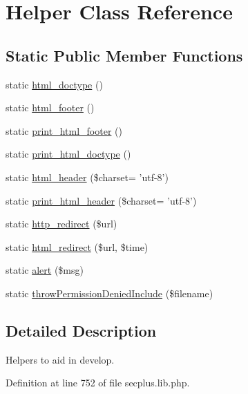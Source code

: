 \hypertarget{class_sec_plus_1_1_helper}{
\section{Helper Class Reference}
\label{class_sec_plus_1_1_helper}
}
\subsection*{Static Public Member Functions}
\begin{DoxyCompactItemize}
\item 
static \hyperlink{class_sec_plus_1_1_helper_a2eccf64c434dce4bdc22599c553d6958}{html\_\-doctype} ()
\item 
static \hyperlink{class_sec_plus_1_1_helper_afa332dc931fb2db52cec5e445d001f9e}{html\_\-footer} ()
\item 
static \hyperlink{class_sec_plus_1_1_helper_a0699678cd9d874a83564c2f77c1796fd}{print\_\-html\_\-footer} ()
\item 
static \hyperlink{class_sec_plus_1_1_helper_a4769a0d4d99640687282371b6880869f}{print\_\-html\_\-doctype} ()
\item 
static \hyperlink{class_sec_plus_1_1_helper_a78dac94567ed19b36739d0b92d7aaa6b}{html\_\-header} (\$charset= 'utf-\/8')
\item 
static \hyperlink{class_sec_plus_1_1_helper_a9fa2928305832c296afcd2c0c3294119}{print\_\-html\_\-header} (\$charset= 'utf-\/8')
\item 
static \hyperlink{class_sec_plus_1_1_helper_af4615286d5ed963c88b6d8f13463f8e0}{http\_\-redirect} (\$url)
\item 
static \hyperlink{class_sec_plus_1_1_helper_a4cbf648b3f3fdf7eddf1834fb0f35305}{html\_\-redirect} (\$url, \$time)
\item 
static \hyperlink{class_sec_plus_1_1_helper_acf2e51d400bd9340247809adb9cd0664}{alert} (\$msg)
\item 
static \hyperlink{class_sec_plus_1_1_helper_ae9f4828bdc8ae1f262eb0b6154d4c531}{throwPermissionDeniedInclude} (\$filename)
\end{DoxyCompactItemize}


\subsection{Detailed Description}
Helpers to aid in develop. 

Definition at line 752 of file secplus.lib.php.



